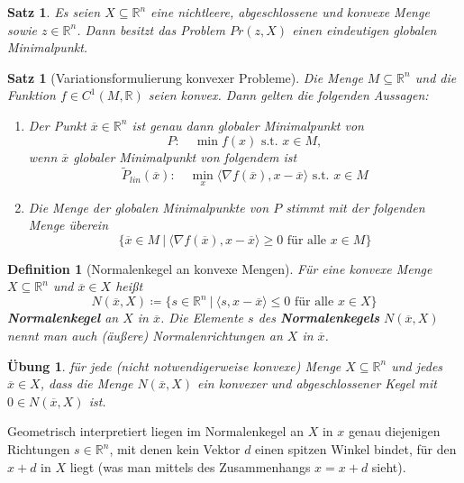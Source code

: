 \documentclass[11pt]{scrreprt}
\newcounter{thm}
\theoremstyle{thmstyle}
\numberwithin{thm}{section}
\newtheorem{definition}[thm]{Definition}
\newtheorem{satz}[thm]{Satz}
\newtheorem{uebung}[thm]{Übung}
\begin{document}
\begin{satz}
	Es seien $X \subseteq \mathbb{R}^n$ eine nichtleere, abgeschlossene und konvexe Menge sowie $z \in \mathbb{R}^n$. Dann besitzt das Problem $Pr(z, X)$ einen eindeutigen globalen Minimalpunkt.	
\end{satz}

\begin{satz}[Variationsformulierung konvexer Probleme]
	Die Menge $M \subseteq \mathbb{R}^n$ und die Funktion $f \in C^1(M, \mathbb{R})$ seien konvex. Dann gelten die folgenden Aussagen:
	\begin{enumerate}[label=\alph*\upshape)]
		\item Der Punkt $\overline{x} \in \mathbb{R}^n$ ist genau dann globaler Minimalpunkt von
				$$ P: \quad \min f(x) \text{ s.t. } x \in M, $$
			wenn $\overline{x}$ globaler Minimalpunkt von folgendem ist
			 $$ \tilde{P}_{lin}(\overline{x}): \quad \min_x \langle \nabla f(\overline{x}), x - \overline{x} \rangle \text{ s.t. } x \in M $$
		\item Die Menge der globalen Minimalpunkte von $P$ stimmt mit der folgenden Menge überein
			$$ \big\{ \overline{x} \in M ~|~  \langle \nabla f(\overline{x}), x - \overline{x} \rangle \geq 0 \text{ für alle } x \in M \big\} $$
	\end{enumerate}	
\end{satz}

\begin{definition}[Normalenkegel an konvexe Mengen]
	Für eine konvexe Menge $X \subseteq \mathbb{R}^n$ und $\overline{x} \in X$ heißt
		$$ N(\overline{x}, X) \coloneqq \big\{ s \in \mathbb{R}^n ~|~\langle s, x - \overline{x} \rangle \leq 0 \text{ für alle } x \in X \big\} $$ \textbf{Normalenkegel} an $X$ in $\overline{x}$. Die Elemente $s$ des \textbf{Normalenkegels} $N(\overline{x}, X)$ nennt man auch (äußere) Normalenrichtungen an $X$ in $\overline{x}$.
\end{definition}
 
\begin{uebung}
	für jede (nicht notwendigerweise konvexe) Menge $X \subseteq \mathbb{R}^n$ und jedes $\overline{x} \in X$, dass die Menge $N(\overline{x}, X)$ ein konvexer und abgeschlossener Kegel mit $0 \in N(\overline{x}, X)$ ist.
\end{uebung} 

Geometrisch interpretiert liegen im Normalenkegel an $X$ in $x$ genau diejenigen Richtungen $s \in \mathbb{R}^n$, mit denen kein Vektor $d$ einen spitzen Winkel bindet, für den $x+d$ in $X$ liegt (was man mittels des Zusammenhangs $x = x + d$ sieht).
 
\end{document}
